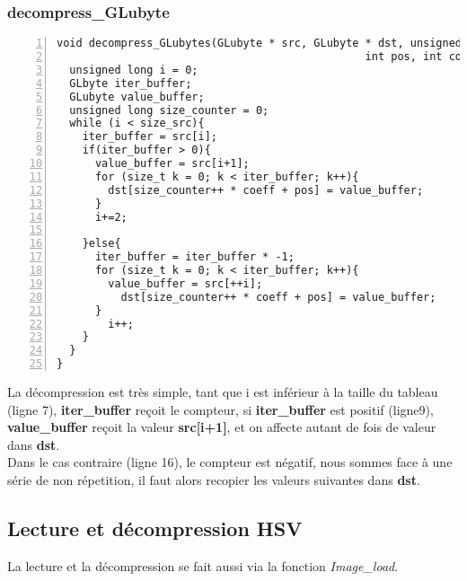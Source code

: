\documentclass[12pt, letterpaper]{article}
\begin{document}
\subsubsection{decompress\_GLubyte}
\begin{Verbatim}[numbers=left,xleftmargin = 5mm]
void decompress_GLubytes(GLubyte * src, GLubyte * dst, unsigned long size_src, 
                                                int pos, int coeff){
  unsigned long i = 0;
  GLbyte iter_buffer;
  GLubyte value_buffer;
  unsigned long size_counter = 0;
  while (i < size_src){
    iter_buffer = src[i];
    if(iter_buffer > 0){
      value_buffer = src[i+1];
      for (size_t k = 0; k < iter_buffer; k++){
        dst[size_counter++ * coeff + pos] = value_buffer;
      }
      i+=2;

    }else{ 
      iter_buffer = iter_buffer * -1;
      for (size_t k = 0; k < iter_buffer; k++){
        value_buffer = src[++i];
          dst[size_counter++ * coeff + pos] = value_buffer;
      }
        i++;               
    }
  }
}
\end{Verbatim}
La décompression est très simple, tant que i est inférieur à la taille du tableau (ligne 7), 
\textbf{iter\_buffer} reçoit le compteur, si \textbf{iter\_buffer} est positif (ligne9), \textbf{value\_buffer} reçoit la valeur 
\textbf{src[i+1]}, et on affecte autant de fois de valeur dans \textbf{dst}.\\
Dans le cas contraire (ligne 16), le compteur est négatif, nous sommes face à une série de non répetition, il faut 
alors recopier les valeurs suivantes dans \textbf{dst}.

\subsection{Lecture et décompression HSV}
La lecture et la décompression se fait aussi via la fonction \textit{Image\_load}.
\end{document}
